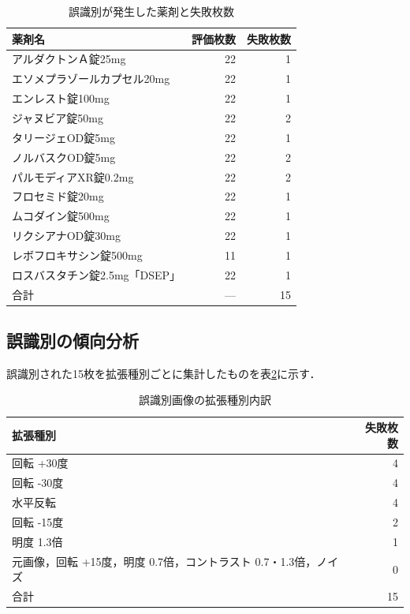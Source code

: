 \documentclass{ltjsarticle}
\begin{document}
\begin{table}[h]
\centering
\caption{誤識別が発生した薬剤と失敗枚数}
\label{tab:failed_drugs}
\small
\begin{tabular}{lrr}
\hline
薬剤名 & 評価枚数 & 失敗枚数 \\
\hline
アルダクトンＡ錠25mg & 22 & 1 \\
エソメプラゾールカプセル20mg & 22 & 1 \\
エンレスト錠100mg & 22 & 1 \\
ジャヌビア錠50mg & 22 & 2 \\
タリージェOD錠5mg & 22 & 1 \\
ノルバスクOD錠5mg & 22 & 2 \\
パルモディアXR錠0.2mg & 22 & 2 \\
フロセミド錠20mg & 22 & 1 \\
ムコダイン錠500mg & 22 & 1 \\
リクシアナOD錠30mg & 22 & 1 \\
レボフロキサシン錠500mg & 11 & 1 \\
ロスバスタチン錠2.5mg「DSEP」 & 22 & 1 \\
\hline
合計 & --- & 15 \\
\hline
\end{tabular}
\end{table}

\subsection{誤識別の傾向分析}

誤識別された15枚を拡張種別ごとに集計したものを表\ref{tab:failed_aug}に示す．

\begin{table}[h]
\centering
\caption{誤識別画像の拡張種別内訳}
\label{tab:failed_aug}
\begin{tabular}{lr}
\hline
拡張種別 & 失敗枚数 \\
\hline
回転 +30度 & 4 \\
回転 -30度 & 4 \\
水平反転 & 4 \\
回転 -15度 & 2 \\
明度 1.3倍 & 1 \\
元画像，回転 +15度，明度 0.7倍，コントラスト 0.7・1.3倍，ノイズ & 0 \\
\hline
合計 & 15 \\
\hline
\end{tabular}
\end{table}
\end{document}
